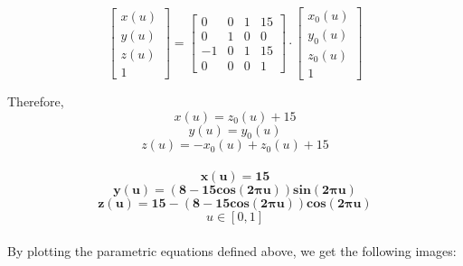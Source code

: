 \documentclass[acmlarge,nonacm=true]{acmart}
\begin{document}
\begin{displaymath}
	\begin{bmatrix}
		x(u) \\
		y(u) \\
		z(u) \\
		1
	 \end{bmatrix} = \begin{bmatrix}
		0 & 0 & 1 & 15 \\
		0 & 1 & 0 & 0 \\
		-1 & 0 & 1 & 15 \\
		0 & 0 & 0 & 1
	 \end{bmatrix} \cdot \begin{bmatrix}
		x_0(u) \\
		y_0(u) \\
		z_0(u) \\
		1
	 \end{bmatrix}
\end{displaymath}

Therefore,
\begin{displaymath}
	x(u) =  z_0(u) + 15
\end{displaymath}
\begin{displaymath}
	y(u) =  y_0(u)
\end{displaymath}
\begin{displaymath}
	z(u) =  -x_0(u) + z_0(u) + 15
\end{displaymath}\\
\begin{displaymath}
	\mathbf{x(u) = 15}
\end{displaymath}
\begin{displaymath}
	\mathbf{y(u) =  (8 - 15cos(2\pi u))sin(2\pi u)}
\end{displaymath}
\begin{displaymath}
	\mathbf{z(u) =  15 - (8 - 15cos(2\pi u))cos(2\pi u)}
\end{displaymath}
\begin{displaymath}
	u \in [0, 1]
\end{displaymath}
\\
By plotting the parametric equations defined above, we get the following images:
\end{document}
